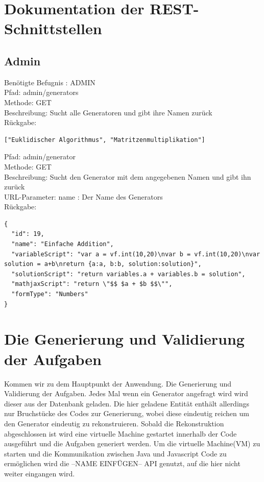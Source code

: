 \begin{enumerate}
\section{Dokumentation der REST-Schnittstellen}

\subsection{Admin}

Benötigte Befugnis : ADMIN \\

\noindent Pfad: admin/generators \\
Methode: GET \\
Beschreibung: Sucht alle Generatoren und gibt ihre Namen zurück \\
Rückgabe: \begin{lstlisting} 
["Euklidischer Algorithmus", "Matritzenmultiplikation"]
\end{lstlisting}

\noindent Pfad: admin/generator \\
Methode: GET \\
Beschreibung: Sucht den Generator mit dem angegebenen Namen und gibt ihn zurück \\
URL-Parameter: name : Der Name des Generators \\
Rückgabe: \begin{lstlisting} 
{
  "id": 19,
  "name": "Einfache Addition",
  "variableScript": "var a = vf.int(10,20)\nvar b = vf.int(10,20)\nvar solution = a+b\nreturn {a:a, b:b, solution:solution}",
  "solutionScript": "return variables.a + variables.b = solution",
  "mathjaxScript": "return \"$$ $a + $b $$\"",
  "formType": "Numbers"
}
\end{lstlisting}


\section{Die Generierung und Validierung der Aufgaben}

Kommen wir zu dem Hauptpunkt der Anwendung. Die Generierung und Validierung der Aufgaben. Jedes Mal wenn ein Generator angefragt wird wird dieser aus der Datenbank geladen. Die hier geladene Entität enthält allerdings nur Bruchstücke des Codes zur Generierung, wobei diese eindeutig reichen um den Generator eindeutig zu rekonstruieren. Sobald die Rekonstruktion abgeschlossen ist wird eine virtuelle Machine gestartet innerhalb der Code ausgeführt und die Aufgaben generiert werden. Um die virtuelle Machine(VM) zu starten und die Kommunikation zwischen Java und Javascript Code zu ermöglichen wird die --NAME EINFÜGEN-- API genutzt, auf die hier nicht weiter eingangen wird. \\


\end{enumerate}
